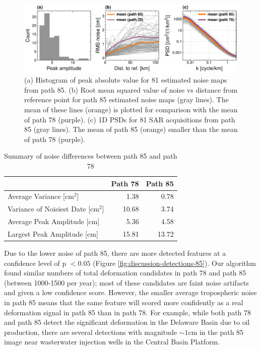 \documentclass{utexasthesis}
\begin{document}
\begin{figure}[hbt!]
\centering 
\includegraphics[width=0.98\linewidth]{paper2/figures/figure_discussion_path85_plots.pdf}
\caption{
(a) Histogram of peak absolute value for 81 estimated noise maps from path 85. 
(b) Root mean squared value of noise vs distance from reference point for path 85 estimated noise maps (gray lines). The mean of these lines (orange) is plotted for comparison with the mean of path 78 (purple).
(c) 1D PSDs for 81 SAR acquisitions from path 85 (gray lines). The mean of path 85 (orange) smaller than the mean of path 78 (purple). 
}
\label{fig:discussion-noise-85}
\end{figure}


\begin{table}
\centering
\caption{Summary of noise differences between path 85 and path 78}
\begin{tabular}{lrr}
\toprule
{} &  Path 78 &  Path 85 \\
\midrule
Average Variance [cm$^2$]             &     1.38 &     0.78 \\
Variance of Noisiest Date [cm$^2$] &    10.68 &     3.74 \\
Average Peak Amplitude [cm]            &     5.36 &     4.58 \\
Largest Peak Amplitude [cm]         &    15.81 &    13.72 \\
\bottomrule
\end{tabular}
\label{tab:path85-compare}
\end{table}




Due to the lower noise of path 85, there are more detected features at a confidence level of p $< 0.05 $ (Figure \ref{fig:discussion-detections-85}). Our algorithm found similar numbers of total deformation candidates in path 78 and path 85 (between 1000-1500 per year); most of these candidates are faint noise artifacts and given a low confidence score. However, the smaller average tropospheric noise in path 85 means that the same feature will scored more confidently as a real deformation signal in path 85 than in path 78.  For example, while both path 78 and path 85 detect the significant deformation in the Delaware Basin due to oil production, there are several detections with magnitude $\sim1$cm in the path 85 image near wasterwater injection wells in the Central Basin Platform. 
\end{document}
